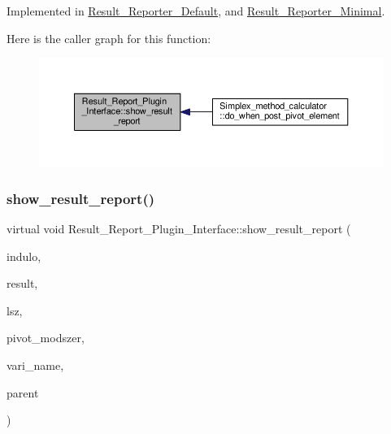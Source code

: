 Implemented in \hyperlink{classResult__Reporter__Default_a0cd7068847fcea1f0f4a6ba82441c4c6}{Result\+\_\+\+Reporter\+\_\+\+Default}, and \hyperlink{classResult__Reporter__Minimal_af40ff386283122012cf55bf9c415fa71}{Result\+\_\+\+Reporter\+\_\+\+Minimal}.

Here is the caller graph for this function\+:\nopagebreak
\begin{figure}[H]
\begin{center}
\leavevmode
\includegraphics[width=350pt]{classResult__Report__Plugin__Interface_a7dc45f2c25e0f4f4f99b2d7cd1799aa0_icgraph}
\end{center}
\end{figure}
\mbox{\label{classResult__Report__Plugin__Interface_a7dc45f2c25e0f4f4f99b2d7cd1799aa0}} 
\subsubsection{\texorpdfstring{show\+\_\+result\+\_\+report()}{show\_result\_report()}\hspace{0.1cm}{\footnotesize\ttfamily [3/3]}}
{\footnotesize\ttfamily virtual void Result\+\_\+\+Report\+\_\+\+Plugin\+\_\+\+Interface\+::show\+\_\+result\+\_\+report (\begin{DoxyParamCaption}\item[{Q\+Standard\+Item\+Model $\ast$}]{indulo,  }\item[{Q\+Standard\+Item\+Model $\ast$}]{result,  }\item[{int}]{lsz,  }\item[{Q\+String}]{pivot\+\_\+modszer,  }\item[{Q\+String}]{vari\+\_\+name,  }\item[{Q\+Widget $\ast$}]{parent }\end{DoxyParamCaption})\hspace{0.3cm}{\ttfamily [pure virtual]}}



